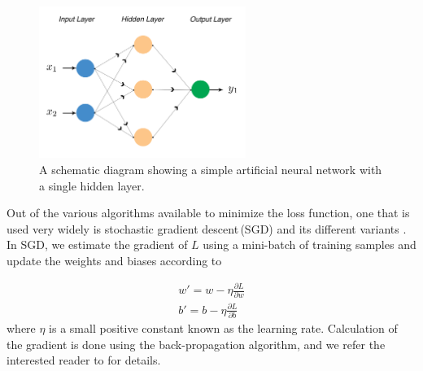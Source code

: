 \begin{figure}[htbp]
	\begin{center}
		\includegraphics[width=0.6\textwidth]{schematic_toy_network.pdf}
	\end{center}
	\caption{A schematic diagram showing a simple artificial neural network with a single hidden layer.}
	\label{fig:schematic_network}
\end{figure}

Out of the various algorithms available to minimize the loss function, one that is used very widely is stochastic gradient descent\,(SGD) and its different variants \citep{nielsen}. In SGD, we estimate the gradient of $L$ using a mini-batch of training samples and update the weights and biases according to

\begin{equation}
\begin{aligned}
w' = w -\eta \frac{\partial L}{\partial w} \\
b' = b - \eta \frac{\partial L}{\partial b}
\end{aligned}
\label{eq:sgd}
\end{equation}
where $\eta$ is a small positive constant known as the learning rate. Calculation of the gradient is done using the back-propagation algorithm, and we refer the interested reader to \citet{rumelhart_88} for details.

